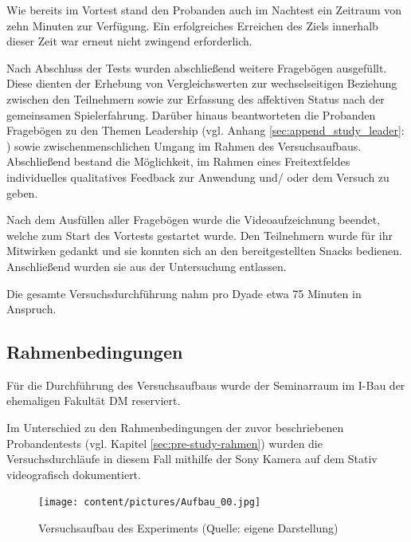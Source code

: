 Wie bereits im Vortest stand den Probanden auch im Nachtest ein Zeitraum von zehn Minuten zur Verfügung. Ein erfolgreiches Erreichen des Ziels innerhalb dieser Zeit war erneut nicht zwingend erforderlich.

Nach Abschluss der Tests wurden abschließend weitere Fragebögen ausgefüllt. Diese dienten der Erhebung von Vergleichswerten zur wechselseitigen Beziehung zwischen den Teilnehmern sowie zur Erfassung des affektiven Status nach der gemeinsamen Spielerfahrung. Darüber hinaus beantworteten die Probanden Fragebögen zu den Themen Leadership (vgl. Anhang \ref{sec:append_study_leader}: ) sowie zwischenmenschlichen Umgang im Rahmen des Versuchsaufbaus. Abschließend bestand die Möglichkeit, im Rahmen eines Freitextfeldes individuelles qualitatives Feedback zur Anwendung und/ oder dem Versuch zu geben.

Nach dem Ausfüllen aller Fragebögen wurde die Videoaufzeichnung beendet, welche zum Start des Vortests gestartet wurde. Den Teilnehmern wurde für ihr Mitwirken gedankt und sie konnten sich an den bereitgestellten Snacks bedienen. Anschließend wurden sie aus der Untersuchung entlassen.

Die gesamte Versuchsdurchführung nahm pro Dyade etwa 75 Minuten in Anspruch.

\subsection{Rahmenbedingungen}

Für die Durchführung des Versuchsaufbaus wurde der Seminarraum im I-Bau der ehemaligen Fakultät \ac{DM} reserviert.

Im Unterschied zu den Rahmenbedingungen der zuvor beschriebenen Probandentests (vgl. Kapitel \ref{sec:pre-study-rahmen}) wurden die Versuchsdurchläufe in diesem Fall mithilfe der Sony Kamera auf dem Stativ videografisch dokumentiert.

\begin{figure}[ht]
\centering
\texttt{[image: content/pictures/Aufbau\_00.jpg]}
\caption{Versuchsaufbau des Experiments (Quelle: eigene Darstellung)}
\label{fig:study-experiment-00}
\end{figure}

